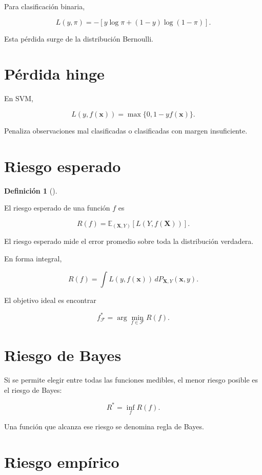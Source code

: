 \documentclass[
  spanish,
  11pt,
  letterpaper,
  DIV=11,
  numbers=noendperiod]{scrreprt}
\theoremstyle{definition}
\newtheorem{definition}{Definición}[chapter]
\theoremstyle{plain}
\theoremstyle{definition}
\theoremstyle{remark}
\begin{document}
Para clasificación binaria,

\[
L(y,\pi)
=
-
\left[
y\log\pi
+
(1-y)\log(1-\pi)
\right].
\]

Esta pérdida surge de la distribución Bernoulli.

\section{Pérdida hinge}\label{puxe9rdida-hinge-1}

En SVM,

\[
L(y,f(\mathbf{x}))
=
\max
\{
0,
1-yf(\mathbf{x})
\}.
\]

Penaliza observaciones mal clasificadas o clasificadas con margen
insuficiente.

\section{Riesgo esperado}\label{riesgo-esperado}

\begin{definition}[]\protect\hypertarget{def-riesgo-esperado}{}\label{def-riesgo-esperado}

El riesgo esperado de una función \(f\) es

\[
R(f)
=
\mathbb{E}_{(\mathbf{X},Y)}
\left[
L(
Y,
f(\mathbf{X})
)
\right].
\]

\end{definition}

El riesgo esperado mide el error promedio sobre toda la distribución
verdadera.

En forma integral,

\[
R(f)
=
\int
L(
y,
f(\mathbf{x})
)
\,dP_{\mathbf{X},Y}(\mathbf{x},y).
\]

El objetivo ideal es encontrar

\[
f^{*}_{\mathcal{F}}
=
\arg\min_{f\in\mathcal{F}}
R(f).
\]

\section{Riesgo de Bayes}\label{riesgo-de-bayes}

Si se permite elegir entre todas las funciones medibles, el menor riesgo
posible es el riesgo de Bayes:

\[
R^{*}
=
\inf_f R(f).
\]

Una función que alcanza ese riesgo se denomina regla de Bayes.

\section{Riesgo empírico}\label{riesgo-empuxedrico-1}
\end{document}
